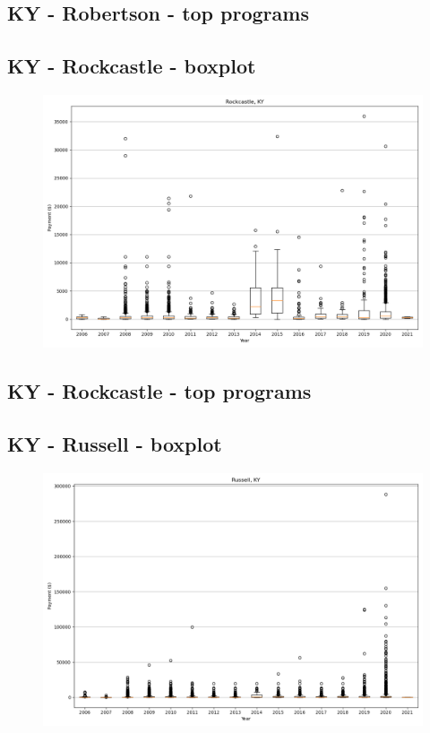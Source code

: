 \subsection*{KY - Robertson - top programs}

\newpage
\subsection*{KY - Rockcastle - boxplot}
\begin{figure}[h]
\centering
\includegraphics[width=7in]{../output/boxplots/counties/Rockcastle-KY_boxplot.png}
\end{figure}


\subsection*{KY - Rockcastle - top programs}

\newpage
\subsection*{KY - Russell - boxplot}
\begin{figure}[h]
\centering
\includegraphics[width=7in]{../output/boxplots/counties/Russell-KY_boxplot.png}
\end{figure}


